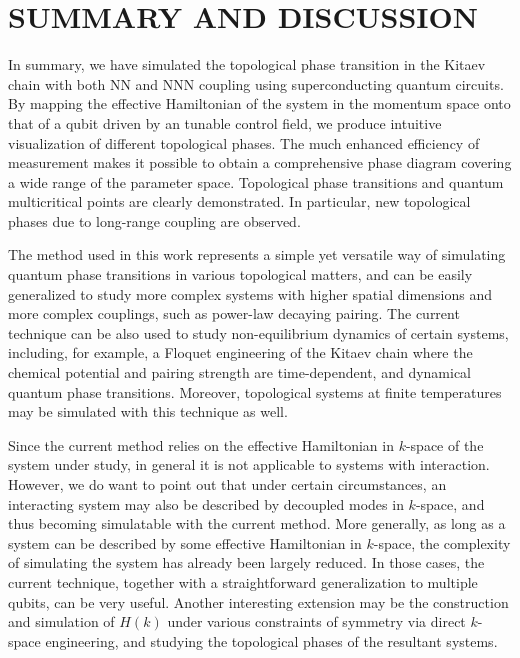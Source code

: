 \documentclass[aps,reprint,groupedaddress,showpacs,superscriptaddress]{revtex4-1}
\begin{document}
\section{SUMMARY AND DISCUSSION}
In summary, we have simulated the topological phase transition in the Kitaev chain with both NN and NNN coupling using superconducting quantum circuits. By mapping the effective Hamiltonian of the system in the momentum space onto that of a qubit driven by an tunable control field, we produce intuitive visualization of different topological phases. The much enhanced efficiency of measurement makes it possible to obtain a comprehensive phase diagram covering a wide range of the parameter space. Topological phase transitions and quantum multicritical points are clearly demonstrated. In particular, new topological phases due to long-range coupling are observed. 

The method used in this work represents a simple yet versatile way of simulating quantum phase transitions in various topological matters, and can be easily generalized to study more complex systems with higher spatial dimensions and more complex couplings, such as power-law decaying pairing\cite{Viyuela_2016,Vodola2014,Dutta2017}. The current technique can be also used to study non-equilibrium dynamics of certain systems, including, for example, a Floquet engineering of the Kitaev chain where the chemical potential and pairing strength are time-dependent\cite{Benito2014,Li2017}, and dynamical quantum phase transitions\cite{Guo2019}. Moreover, topological systems at finite temperatures may be simulated with this technique as well\cite{Andersson2016,Dutta2018}. 

Since the current method relies on the effective Hamiltonian in $k$-space of the system under study, in general it is not applicable to systems with interaction. However, we do want to point out that under certain circumstances, an interacting system may also be described by decoupled modes in $k$-space\cite{Miao2017}, and thus becoming simulatable with the current method. More generally, as long as a system can be described by some effective Hamiltonian in $k$-space, the complexity of simulating the system has already been largely reduced. In those cases, the current technique, together with a straightforward generalization to multiple qubits, can be very useful. Another interesting extension may be the construction and simulation of $H(k)$ under various constraints of symmetry via direct $k$-space engineering\cite{Rahul2019}, and studying the topological phases of the resultant systems.  
\end{document}
